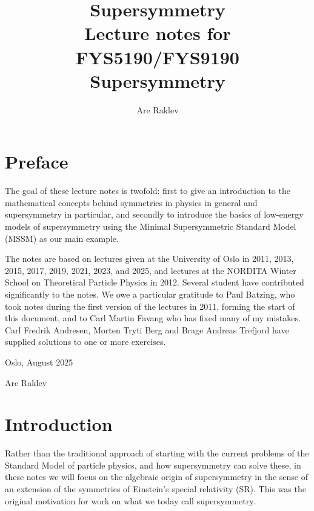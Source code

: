 \documentclass[11pt,a4paper]{book}
\title{{\Huge Supersymmetry} \\ 
\vspace{5mm} Lecture notes for FYS5190/FYS9190 Supersymmetry}
\author{Are Raklev}
\begin{document}

\maketitle


\chapter*{Preface}


The goal of these lecture notes is twofold: first to give an introduction to the mathematical concepts behind symmetries in physics in general and supersymmetry in particular, and secondly to introduce the basics of low-energy models of supersymmetry using the Minimal Supersymmetric Standard Model (MSSM) as our main example. 

The notes are based on lectures given at the University of Oslo in 2011, 2013, 2015, 2017, 2019, 2021, 2023, and 2025, and lectures at the NORDITA Winter School on Theoretical Particle Physics in 2012.  Several student have contributed significantly to the notes. We owe a particular gratitude to Paul Batzing, who took notes during the first version of the lectures in 2011, forming the start of this document, and to Carl Martin Favang who has fixed many of my mistakes. Carl Fredrik Andresen, Morten Tryti Berg and Brage Andreas Trefjord have supplied solutions to one or more exercises.


\vspace{5mm}
Oslo, August 2025

Are Raklev





\tableofcontents



\chapter*{Introduction}
Rather than the traditional approach of starting with the current problems of the Standard Model of particle physics, and how supersymmetry can solve these, in these notes we will focus on the algebraic origin of supersymmetry in the sense of an extension of the symmetries of Einstein's special relativity (SR). This was the original motivation for work on what we today call supersymmetry. 
\end{document}
